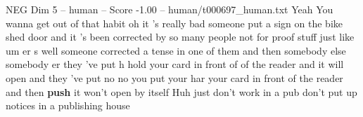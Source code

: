 \begin{textsample}{NEG Dim 5 – human – Score -1.00 – human/t000697\_human.txt}  \label{ex:f5_neg_036}
Yeah You wanna get out of that habit oh it 's really bad someone put a sign on the bike shed door and it 's been corrected by so many people not for proof stuff just like um er s well someone corrected a tense in one of them and then somebody else somebody er they 've put h hold your card in front of of the reader and it will open and they 've put no no you put your har your card in front of the reader and then \textbf{push} it won't open by itself Huh just don't work in a pub don't put up notices in a publishing house

\end{textsample}
